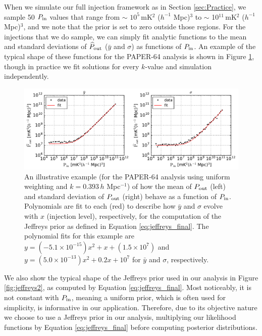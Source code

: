\documentclass[preprint2,numberedappendix,tighten]{aastex6}  %
\begin{document}
When we simulate our full injection framework as in Section \ref{sec:Practice}, we sample 50 $P_{\rm in}$ values that range from $\sim$ $10^{5}$\,mK$^{2}$ ($h^{-1}$ Mpc)$^{3}$ to $\sim$ 10$^{11}$\,mK$^{2}$ ($h^{-1}$ Mpc)$^{3}$, and we note that the prior is set to zero outside those regions. For the injections that we do sample, we can simply fit analytic functions to the mean and standard deviations of $\widehat{P}_{\rm out}$ ($\bar y$ and $\sigma$) as functions of $P_{\rm in}$. An example of the typical shape of these functions for the PAPER-64 analysis is shown in Figure \ref{fig:jeffreys1}, though in practice we fit solutions for every $k$-value and simulation independently.

\begin{figure}
	\centering
	\includegraphics[width=\columnwidth]{plots/jeffrey_fits.pdf}
	\caption{An illustrative example (for the PAPER-64 analysis using uniform weighting and $k=0.393$\,$h$ Mpc$^{-1}$) of how the mean of $P_{\rm out}$ (left) and standard deviation of $P_{\rm out}$ (right) behave as a function of $P_{\rm in}$. Polynomials are fit to each (red) to describe how $\bar y$ and $\sigma$ evolve with $x$ (injection level), respectively, for the computation of the Jeffreys prior as defined in Equation \eqref{eq:jeffreys_final}. The polynomial fits for this example are $y = (-5.1 \times 10^{-15})x^{2} + x + (1.5 \times 10^{7})$ and $y = (5.0 \times 10^{-13})x^{2} + 0.2 x + 10^{7}$ for $\bar y$ and $\sigma$, respectively.}
	\label{fig:jeffreys1}
\end{figure}

We also show the typical shape of the Jeffreys prior used in our analysis in Figure \ref{fig:jeffreys2}, as computed by Equation \eqref{eq:jeffreys_final}. Most noticeably, it is not constant with $P_{\rm in}$, meaning a uniform prior, which is often used for simplicity, is informative in our application. Therefore, due to its objective nature we choose to use a Jeffreys prior in our analysis, multiplying our likelihood functions by Equation \eqref{eq:jeffreys_final} before computing posterior distributions.
\end{document}
